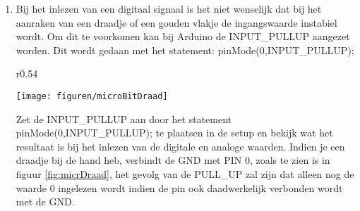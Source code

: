 \begin{enumerate}
	\item Bij het inlezen van een digitaal signaal is het niet wenselijk dat bij het aanraken van een draadje of een gouden vlakje de ingangswaarde instabiel wordt. Om dit te voorkomen kan bij Arduino de  \textcolor{arduinoBlue}{INPUT\_PULLUP} aangezet worden. Dit wordt gedaan met het statement: \textcolor{arduinoOrange}{pinMode}(0,\textcolor{arduinoBlue}{INPUT\_PULLUP}); 
	
	\begin{minipage}{\linewidth}
		\begin{wrapfigure}[25]{r}{0.54\textwidth}
			\vspace{-15pt}
			\begin{center}
				\centering
				\captionsetup{justification=centering}
				\texttt{[image: figuren/microBitDraad]}
			\end{center}
			\caption{Input verbonden met de GND .}
			\label{fig:micrDraad}
		\end{wrapfigure}
		Zet de \textcolor{arduinoBlue}{INPUT\_PULLUP} aan door het statement 
		\textcolor{arduinoOrange}{pinMode}(0,\textcolor{arduinoBlue}{INPUT\_PULLUP});  
		te plaatsen in de \textcolor{arduinoGreen}{setup} en bekijk wat het resultaat is bij het inlezen van de digitale en analoge waarden. Indien je een draadje bij de hand heb, verbindt de GND met PIN 0, zoals te zien is in figuur \ref{fig:micrDraad}, het gevolg van de PULL\_UP zal zijn dat alleen nog de waarde 0 ingelezen wordt indien de pin ook daadwerkelijk verbonden wordt met de GND.
	\end{minipage}
	
	
	
	\begin{comment}
		Zet de \textcolor{arduinoBlue}{INPUT\_PULLUP}  aan door het statement  \textcolor{arduinoOrange}{pinMode}(0,\textcolor{arduinoBlue}{INPUT\_PULLUP});  
		te plaatsen in de \textcolor{arduinoGreen}{setup} en bekijk wat het resultaat is bij het inlezen van de digitale en analoge waarden.
	\end{comment}
\end{enumerate}
